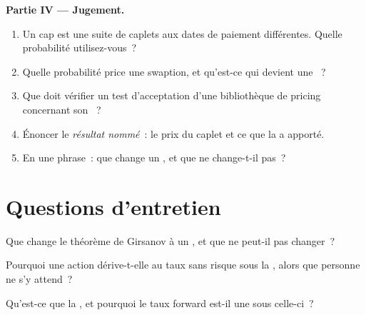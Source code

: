 \begin{problem}
\medskip\noindent\textbf{Partie IV --- Jugement.}
\begin{enumerate}[resume]
\item Un cap est une suite de caplets aux dates de paiement différentes. Quelle probabilité utilisez-vous~?
\item Quelle probabilité price une swaption, et qu'est-ce qui devient une ~?
\item Que doit vérifier un test d'acceptation d'une bibliothèque de pricing concernant son ~?
\item Énoncer le \emph{résultat nommé}~: le prix du caplet et ce que la  a apporté.
\item En une phrase~: que change un , et que ne change-t-il pas~?
\end{enumerate}
\end{problem}

\section{Questions d'entretien}

\begin{interviewq}\label{iq:qm:girsanov-and-changes-of-numeraire:1}
Que change le théorème de Girsanov à un , et que ne peut-il pas changer~?
\end{interviewq}

\begin{interviewq}\label{iq:qm:girsanov-and-changes-of-numeraire:2}
Pourquoi une action dérive-t-elle au taux sans risque sous la , alors que personne ne s'y attend~?
\end{interviewq}

\begin{interviewq}\label{iq:qm:girsanov-and-changes-of-numeraire:3}
Qu'est-ce que la , et pourquoi le taux forward est-il une  sous celle-ci~?
\end{interviewq}

